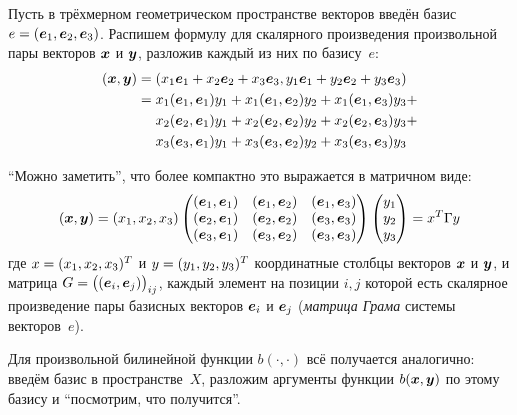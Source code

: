 \documentclass[a4paper,12pt]{article}
\begin{document}
  \begin{example}
    Пусть в трёхмерном геометрическом пространстве векторов введён базис $e \hm= (\bds e_1, \bds e_2, \bds e_3)$.
    Распишем формулу для скалярного произведения произвольной пары векторов $\boldsymbol x$ и $\boldsymbol y$, разложив каждый из них по базису~$e$:
    \begin{equation*}
    \begin{split}
      (\bds x, \bds y)
      &= (x_1 \bds e_1 + x_2 \bds e_2 + x_3 \bds e_3, y_1 \bds e_1 + y_2 \bds e_2 + y_3 \bds e_3)\\
      &= x_1 (\bds e_1, \bds e_1) y_1 + x_1 (\bds e_1, \bds e_2) y_2 + x_1 (\bds e_1, \bds e_3) y_3 +\\
      &\hphantom{= {}}\; x_2 (\bds e_2, \bds e_1) y_1 + x_2 (\bds e_2, \bds e_2) y_2 + x_2 (\bds e_2, \bds e_3) y_3 +\\  %
      &\hphantom{= {}}\; x_3 (\bds e_3, \bds e_1) y_1 + x_3 (\bds e_3, \bds e_2) y_2 + x_3 (\bds e_3, \bds e_3) y_3
    \end{split}
    \end{equation*}
    
    ``Можно заметить'', что более компактно это выражается в матричном виде:
    \[
      (\boldsymbol x, \boldsymbol y) = (x_1, x_2, x_3) \begin{pmatrix}
        (\boldsymbol e_1, \boldsymbol e_1) & (\boldsymbol e_1, \boldsymbol e_2) & (\boldsymbol e_1, \boldsymbol e_3)\\
        (\boldsymbol e_2, \boldsymbol e_1) & (\boldsymbol e_2, \boldsymbol e_2) & (\boldsymbol e_3, \boldsymbol e_3)\\
        (\boldsymbol e_3, \boldsymbol e_1) & (\boldsymbol e_3, \boldsymbol e_2) & (\boldsymbol e_3, \boldsymbol e_3)\\
      \end{pmatrix} \begin{pmatrix}
        y_1\\
        y_2\\
        y_3
      \end{pmatrix} = x^T \Gamma y
    \]
    где $x \hm= (x_1, x_2, x_3)^T$ и $y \hm= (y_1, y_2, y_3)^T$ координатные столбцы векторов $\boldsymbol x$ и $\boldsymbol y$, и матрица $G \hm= \bigl((\bds e_i, \bds e_j)\bigr)_{ij}$, каждый элемент на позиции $i, j$ которой есть скалярное произведение пары базисных векторов $\boldsymbol e_i$ и $\boldsymbol e_j$ (\emph{матрица Грама} системы векторов~$e$).
  \end{example}
  
  Для произвольной билинейной функции $b(\cdot, \cdot)$ всё получается аналогично:
  введём базис в пространстве~$X$, разложим аргументы функции $b(\boldsymbol x, \boldsymbol y)$ по этому базису и ``посмотрим, что получится''.
  
\end{document}
